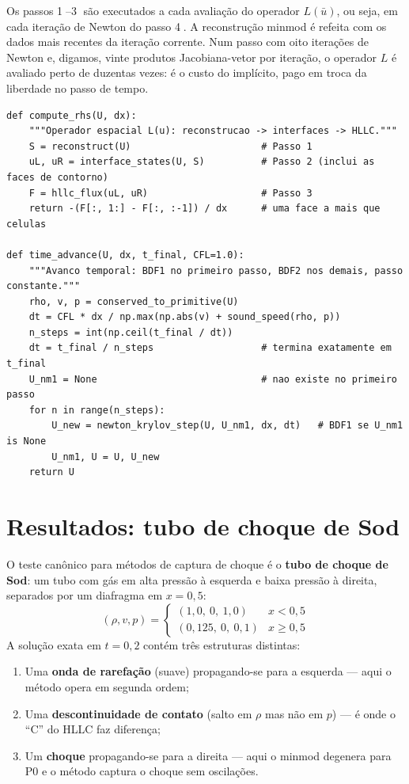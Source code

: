 \documentclass[10pt,a4paper]{article}
\newcommand{\ub}{\bar u}
\begin{document}
Os passos \textcircled{1}--\textcircled{3} são executados a cada avaliação do operador $L(\ub)$, ou seja, em cada iteração de Newton do passo \textcircled{4}. A reconstrução minmod é refeita com os dados mais recentes da iteração corrente. Num passo com oito iterações de Newton e, digamos, vinte produtos Jacobiana-vetor por iteração, o operador $L$ é avaliado perto de duzentas vezes: é o custo do implícito, pago em troca da liberdade no passo de tempo.

\begin{lstlisting}[caption={O pipeline completo em Python. O passo de tempo é fixado uma vez, a partir do estado inicial; é ajustado para terminar exatamente em t\_final.},label=lst:pipeline]
def compute_rhs(U, dx):
    """Operador espacial L(u): reconstrucao -> interfaces -> HLLC."""
    S = reconstruct(U)                       # Passo 1
    uL, uR = interface_states(U, S)          # Passo 2 (inclui as faces de contorno)
    F = hllc_flux(uL, uR)                    # Passo 3
    return -(F[:, 1:] - F[:, :-1]) / dx      # uma face a mais que celulas

def time_advance(U, dx, t_final, CFL=1.0):
    """Avanco temporal: BDF1 no primeiro passo, BDF2 nos demais, passo constante."""
    rho, v, p = conserved_to_primitive(U)
    dt = CFL * dx / np.max(np.abs(v) + sound_speed(rho, p))
    n_steps = int(np.ceil(t_final / dt))
    dt = t_final / n_steps                   # termina exatamente em t_final
    U_nm1 = None                             # nao existe no primeiro passo
    for n in range(n_steps):
        U_new = newton_krylov_step(U, U_nm1, dx, dt)   # BDF1 se U_nm1 is None
        U_nm1, U = U, U_new
    return U
\end{lstlisting}

\section{Resultados: tubo de choque de Sod}

O teste canônico para métodos de captura de choque é o \textbf{tubo de choque de Sod}: um tubo com gás em alta pressão à esquerda e baixa pressão à direita, separados por um diafragma em $x=0{,}5$:
\[
(\rho,v,p)=
\begin{cases}
(1{,}0,\ 0,\ 1{,}0) & x<0{,}5\\
(0{,}125,\ 0,\ 0{,}1) & x\ge0{,}5
\end{cases}
\]
A solução exata em $t=0{,}2$ contém três estruturas distintas:
\begin{enumerate}[leftmargin=2.5em,itemsep=3pt]
\item Uma \textbf{onda de rarefação} (suave) propagando-se para a esquerda --- aqui o método opera em segunda ordem;
\item Uma \textbf{descontinuidade de contato} (salto em $\rho$ mas não em $p$) --- é onde o ``C'' do HLLC faz diferença;
\item Um \textbf{choque} propagando-se para a direita --- aqui o minmod degenera para P0 e o método captura o choque sem oscilações.
\end{enumerate}
\end{document}
